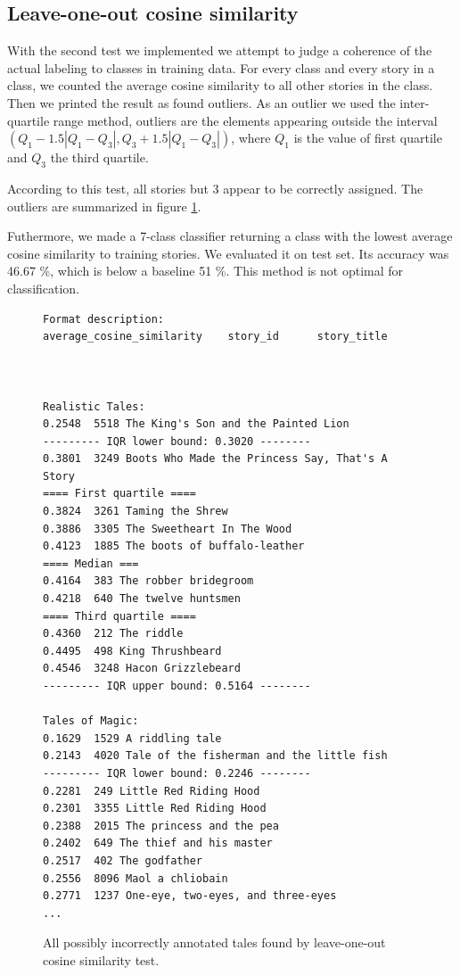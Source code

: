 \documentclass[a4paper]{article}
\begin{document}
\subsection{Leave-one-out cosine similarity}

With the second test we implemented we attempt to judge a coherence of the actual labeling to classes in training data. For every class and every story in a class, we counted the average cosine similarity to all other stories in the class. Then we printed the result as found outliers. As an outlier we used the inter-quartile range method, outliers are the elements appearing outside the interval $(Q_1 - 1.5 |Q_1-Q_3|, Q_3 + 1.5 |Q_1-Q_3| )$, where $Q_1$ is the value of first quartile and $Q_3$ the third quartile.

According to this test, all stories but 3 appear to be correctly assigned. The outliers are summarized in figure \ref{fig:outliers}. 

Futhermore, we made a 7-class classifier returning a class with the lowest average cosine similarity to training stories. We evaluated it on test set. Its accuracy was 46.67 \%, which is below a baseline 51 \%. This method is not optimal for classification.

\begin{figure}
\centering
\begin{verbatim}
Format description:
average_cosine_similarity    story_id      story_title



Realistic Tales:
0.2548	5518 The King's Son and the Painted Lion
--------- IQR lower bound: 0.3020 -------- 
0.3801	3249 Boots Who Made the Princess Say, That's A Story
==== First quartile ====
0.3824	3261 Taming the Shrew
0.3886	3305 The Sweetheart In The Wood
0.4123	1885 The boots of buffalo-leather
==== Median ===
0.4164	383 The robber bridegroom
0.4218	640 The twelve huntsmen
==== Third quartile ====
0.4360	212 The riddle
0.4495	498 King Thrushbeard
0.4546	3248 Hacon Grizzlebeard
--------- IQR upper bound: 0.5164 -------- 

Tales of Magic:
0.1629	1529 A riddling tale
0.2143	4020 Tale of the fisherman and the little fish
--------- IQR lower bound: 0.2246 -------- 
0.2281	249 Little Red Riding Hood
0.2301	3355 Little Red Riding Hood
0.2388	2015 The princess and the pea
0.2402	649 The thief and his master
0.2517	402 The godfather
0.2556	8096 Maol a chliobain
0.2771	1237 One-eye, two-eyes, and three-eyes
...
\end{verbatim}
\caption{All possibly incorrectly annotated tales found by leave-one-out cosine similarity test.}
\label{fig:outliers}
\end{figure}




\nocite{*}


\end{document}
